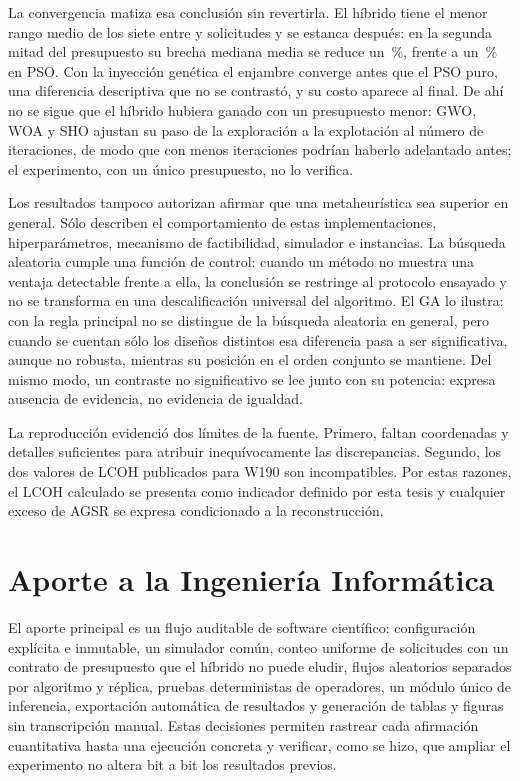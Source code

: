 La convergencia matiza esa conclusión sin revertirla. El híbrido tiene el menor rango medio de los siete entre \ConvControlLeadFrom{} y \ConvControlLeadTo{} solicitudes y se estanca después: en la segunda mitad del presupuesto su brecha mediana media se reduce un \ConvReductionPsoGa\,\%, frente a un \ConvReductionPso\,\% en PSO. Con la inyección genética el enjambre converge antes que el PSO puro, una diferencia descriptiva que no se contrastó, y su costo aparece al final. De ahí no se sigue que el híbrido hubiera ganado con un presupuesto menor: GWO, WOA y SHO ajustan su paso de la exploración a la explotación al número de iteraciones, de modo que con menos iteraciones podrían haberlo adelantado antes; el experimento, con un único presupuesto, no lo verifica.

Los resultados tampoco autorizan afirmar que una metaheurística sea superior en general. Sólo describen el comportamiento de estas implementaciones, hiperparámetros, mecanismo de factibilidad, simulador e instancias. La búsqueda aleatoria cumple una función de control: cuando un método no muestra una ventaja detectable frente a ella, la conclusión se restringe al protocolo ensayado y no se transforma en una descalificación universal del algoritmo. El GA lo ilustra: con la regla principal no se distingue de la búsqueda aleatoria en general, pero cuando se cuentan sólo los diseños distintos esa diferencia pasa a ser significativa, aunque no robusta, mientras su posición en el orden conjunto se mantiene. Del mismo modo, un contraste no significativo se lee junto con su potencia: expresa ausencia de evidencia, no evidencia de igualdad.

La reproducción evidenció dos límites de la fuente. Primero, faltan coordenadas y detalles suficientes para atribuir inequívocamente las discrepancias. Segundo, los dos valores de LCOH publicados para W190 son incompatibles. Por estas razones, el LCOH calculado se presenta como indicador definido por esta tesis y cualquier exceso de AGSR se expresa condicionado a la reconstrucción.

\section{Aporte a la Ingeniería Informática}

El aporte principal es un flujo auditable de software científico: configuración explícita e inmutable, un simulador común, conteo uniforme de solicitudes con un contrato de presupuesto que el híbrido no puede eludir, flujos aleatorios separados por algoritmo y réplica, pruebas deterministas de operadores, un módulo único de inferencia, exportación automática de resultados y generación de tablas y figuras sin transcripción manual. Estas decisiones permiten rastrear cada afirmación cuantitativa hasta una ejecución concreta y verificar, como se hizo, que ampliar el experimento no altera bit a bit los resultados previos.


